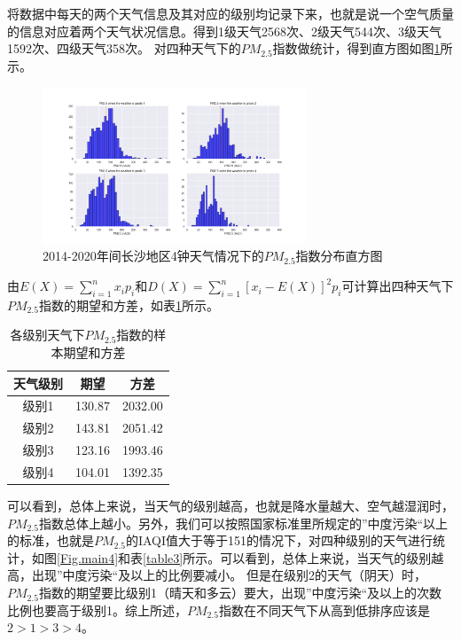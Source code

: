 \documentclass[UTF8,a4paper,10pt]{article}
\begin{document}
\indent 将数据中每天的两个天气信息及其对应的级别均记录下来，也就是说一个空气质量的信息对应着两个天气状况信息。得到1级天气2568次、2级天气544次、3级天气1592次、四级天气358次。
\newpage 对四种天气下的$PM_{2.5}$指数做统计，得到直方图如图\ref{Fig.main3}所示。

\begin{figure}[H] %
\centering %
\includegraphics[width=0.7\textwidth]{..//fig//pm25-weather.png} %
\caption{2014-2020年间长沙地区4钟天气情况下的$PM_{2.5}$指数分布直方图} %
\label{Fig.main3} %
\end{figure}

\indent 由$E(X)=\sum_{i=1}^{n} x_{i} p_{i}$和$D(X)=\sum_{i=1}^{n}\left[x_{i}-E(X)\right]^{2} p_{i}$可计算出四种天气下$PM_{2.5}$指数的期望和方差，如表\ref{table2}所示。

\begin{table}[]
    \caption{各级别天气下$PM_{2.5}$指数的样本期望和方差}
    \vspace{20pt}
    \centering
    \begin{tabular}{ccc}
        \toprule  %
        天气级别& 期望& 方差\\
        \midrule  %
        级别1& 130.87& 2032.00\\
        级别2& 143.81& 2051.42\\
        级别3& 123.16& 1993.46\\
        级别4& 104.01& 1392.35\\
        \bottomrule %
    \end{tabular}
    \label{table2}
\end{table}

\newpage \indent 可以看到，总体上来说，当天气的级别越高，也就是降水量越大、空气越湿润时，$PM_{2.5}$指数总体上越小。另外，我们可以按照国家标准\supercite{ref5}里所规定的”中度污染“以上的标准，也就是$PM_{2.5}$的IAQI值大于等于151的情况下，对四种级别的天气进行统计，如图\ref{Fig.main4}和表\ref{table3}所示。可以看到，总体上来说，当天气的级别越高，出现”中度污染“及以上的比例要减小。
\indent 但是在级别2的天气（阴天）时，$PM_{2.5}$指数的期望要比级别1（晴天和多云）要大，出现”中度污染“及以上的次数比例也要高于级别1。综上所述，$PM_{2.5}$指数在不同天气下从高到低排序应该是$2>1>3>4$。
\end{document}
